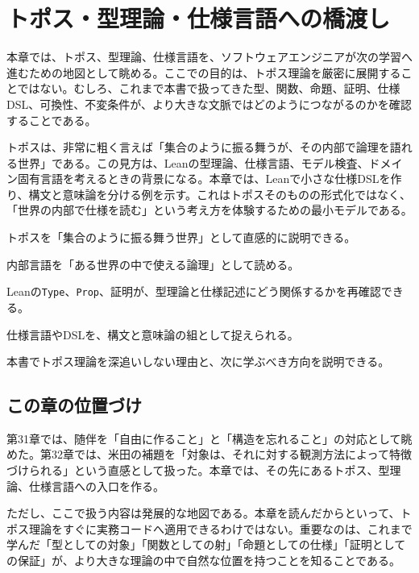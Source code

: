 \chapter{トポス・型理論・仕様言語への橋渡し}
\label{chap:ch33-topos-type-theory-spec-languages}

\begin{chapterabstract}
本章では、トポス、型理論、仕様言語を、ソフトウェアエンジニアが次の学習へ進むための地図として眺める。ここでの目的は、トポス理論を厳密に展開することではない。むしろ、これまで本書で扱ってきた型、関数、命題、証明、仕様DSL、可換性、不変条件が、より大きな文脈ではどのようにつながるのかを確認することである。

トポスは、非常に粗く言えば「集合のように振る舞うが、その内部で論理を語れる世界」である。この見方は、Leanの型理論、仕様言語、モデル検査、ドメイン固有言語を考えるときの背景になる。本章では、Leanで小さな仕様DSLを作り、構文と意味論を分ける例を示す。これはトポスそのものの形式化ではなく、「世界の内部で仕様を読む」という考え方を体験するための最小モデルである。
\end{chapterabstract}

\begin{learninggoals}
  \item トポスを「集合のように振る舞う世界」として直感的に説明できる。
  \item 内部言語を「ある世界の中で使える論理」として読める。
  \item Leanの\texttt{Type}、\texttt{Prop}、証明が、型理論と仕様記述にどう関係するかを再確認できる。
  \item 仕様言語やDSLを、構文と意味論の組として捉えられる。
  \item 本書でトポス理論を深追いしない理由と、次に学ぶべき方向を説明できる。
\end{learninggoals}

\section{この章の位置づけ}

第31章では、随伴を「自由に作ること」と「構造を忘れること」の対応として眺めた。第32章では、米田の補題を「対象は、それに対する観測方法によって特徴づけられる」という直感として扱った。本章では、その先にあるトポス、型理論、仕様言語への入口を作る。

ただし、ここで扱う内容は発展的な地図である。本章を読んだからといって、トポス理論をすぐに実務コードへ適用できるわけではない。重要なのは、これまで学んだ「型としての対象」「関数としての射」「命題としての仕様」「証明としての保証」が、より大きな理論の中で自然な位置を持つことを知ることである。

